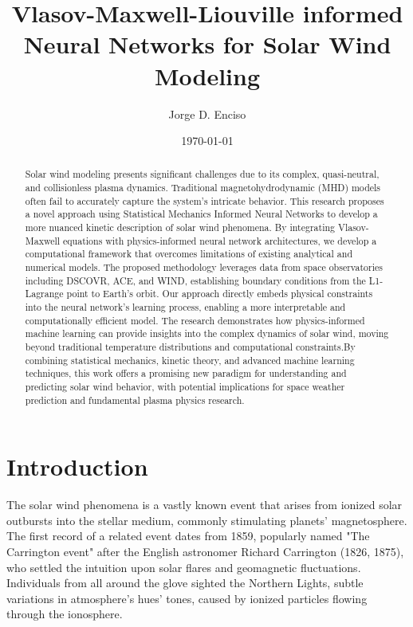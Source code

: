 \documentclass[12pt]{article}
\title{Vlasov-Maxwell-Liouville informed Neural Networks for Solar Wind Modeling}
\author{Jorge D. Enciso}
\date{\today}
\begin{document}
\maketitle

\begin{abstract}
    Solar wind modeling presents significant challenges due to its complex, quasi-neutral, and collisionless plasma dynamics. Traditional magnetohydrodynamic (MHD) models often fail to accurately capture the system's intricate behavior. This research proposes a novel approach using Statistical Mechanics Informed Neural Networks to develop a more nuanced kinetic description of solar wind phenomena. By integrating Vlasov-Maxwell equations with physics-informed neural network architectures, we develop a computational framework that overcomes limitations of existing analytical and numerical models. The proposed methodology leverages data from space observatories including DSCOVR, ACE, and WIND, establishing boundary conditions from the L1-Lagrange point to Earth's orbit. Our approach directly embeds physical constraints into the neural network's learning process, enabling a more interpretable and computationally efficient model. The research demonstrates how physics-informed machine learning can provide insights into the complex dynamics of solar wind, moving beyond traditional temperature distributions and computational constraints.By combining statistical mechanics, kinetic theory, and advanced machine learning techniques, this work offers a promising new paradigm for understanding and predicting solar wind behavior, with potential implications for space weather prediction and fundamental plasma physics research.
\end{abstract}

\tableofcontents
\newpage

\section{Introduction}

The solar wind phenomena is a vastly known event that arises from ionized solar outbursts into the stellar medium, commonly stimulating planets' magnetosphere. \cite{Gosling2007} The first record of a related event dates from 1859, popularly named "The Carrington event" after the English astronomer Richard Carrington (1826, 1875), who settled the intuition upon solar flares and geomagnetic fluctuations. Individuals from all around the glove sighted the Northern Lights, subtle variations in atmosphere's hues' tones, caused by ionized particles flowing through the ionosphere.
\end{document}
